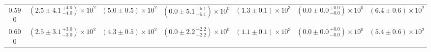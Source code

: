 \begin{center}
\begin{landscape}
\begin{table}[h!]
\begin{tabular}{ccccccc}
0.590 & $\left(2.5 \pm 4.1 \, _{-4.0}^{+4.0} \right) \times 10^{2}$ & $\left(5.0 \pm 0.5\right) \times 10^{2}$ & $\left(0.0 \pm 5.1 \, _{-5.1}^{+5.1} \right) \times 10^{0}$ & $\left(1.3 \pm 0.1\right) \times 10^{3}$ & $\left(0.0 \pm 0.0 \, _{-0.0}^{+0.0} \right) \times 10^{0}$ & $\left(6.4 \pm 0.6\right) \times 10^{2}$ \\
0.600 & $\left(2.5 \pm 3.1 \, _{-3.0}^{+3.0} \right) \times 10^{2}$ & $\left(4.3 \pm 0.5\right) \times 10^{2}$ & $\left(0.0 \pm 2.2 \, _{-2.2}^{+2.2} \right) \times 10^{0}$ & $\left(1.1 \pm 0.1\right) \times 10^{3}$ & $\left(0.0 \pm 0.0 \, _{-0.0}^{+0.0} \right) \times 10^{0}$ & $\left(5.4 \pm 0.6\right) \times 10^{2}$ \\
\hline
\end{tabular}
\end{table}


\end{landscape}
\end{center}
